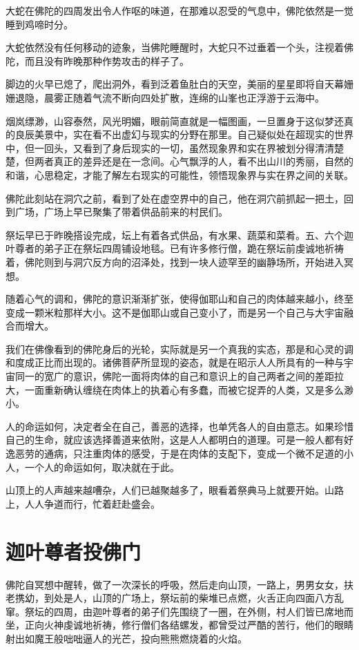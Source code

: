 \documentclass[12pt,twoside,openany]{book}
\begin{document}
大蛇在佛陀的四周发出令人作呕的味道，在那难以忍受的气息中，佛陀依然是一觉睡到鸡啼时分。

大蛇依然没有任何移动的迹象，当佛陀睡醒时，大蛇只不过垂着一个头，注视着佛陀，而且没有昨晚那种作势攻击的样子了。

脚边的火早已熄了，爬出洞外，看到泛着鱼肚白的天空，美丽的星星即将自天幕姗姗退隐，晨雾正随着气流不断向四处扩散，连绵的山峯也正浮游于云海中。

烟岚缥渺，山容泰然，风光明媚，眼前简直就是一幅图画，一旦置身于这似梦还真的良辰美景中，实在看不出虚幻与现实的分野在那里。自己疑似处在超现实的世界中，但一回头，又看到了身后现实的一切，虽然现象界和实在界被划分得清清楚楚，但两者真正的差异还是在一念间。心气飘浮的人，看不出山川的秀丽，自然的和谐，心思稳定，才能了解左右现实的可能性，领悟现象界与实在界之间的关联。

佛陀此刻站在洞穴之前，看到了处在虚空界中的自己，他在洞穴前抓起一把土，回到广场，广场上早已聚集了带着供品前来的村民们。

祭坛早已于昨晚搭设完成，坛上有着各式供品，有水果、蔬菜和菜肴。五、六个迦叶尊者的弟子正在祭坛四周铺设地毯。已有许多修行僧，跪在祭坛前虔诚地祈祷着，佛陀则到与洞穴反方向的沼泽处，找到一块人迹罕至的幽静场所，开始进入冥想。

随着心气的调和，佛陀的意识渐渐扩张，使得伽耶山和自己的肉体越来越小，终至变成一颗米粒那样大小。这不是伽耶山或自己变小了，而是另一个自己与大宇宙融合而增大。

我们在佛像看到的佛陀身后的光轮，实际就是另一个真我的实态，那是和心灵的调和度成正比而出现的。诸佛菩萨所显现的姿态，就是在昭示人人所具有的一种与宇宙同一的宽广的意识，佛陀一面将肉体的自己和意识上的自己两者之间的差距拉大，一面重新确认缠绕在肉体上的执着心有多蠢，而被它捉弄的人类，又是多么渺小。

人的命运如何，决定者全在自己，善恶的选择，也单凭各人的自由意志。如果珍惜自己的生命，就应该选择善道来依附，这是人人都明白的道理。可是一般人都有好逸恶劳的通病，只注重肉体的感受，于是在肉体的支配下，变成一个微不足道的小人，一个人的命运如何，取决就在于此。

山顶上的人声越来越嘈杂，人们已越聚越多了，眼看着祭典马上就要开始。山路上，人人争道而行，忙着赶赴盛会。

\section{迦叶尊者投佛门}\label{sec3.5}

佛陀自冥想中醒转，做了一次深长的呼吸，然后走向山顶，一路上，男男女女，扶老携幼，到处是人，山顶的广场上，祭坛前的柴堆已点燃，火舌正向四面八方乱窜。祭坛的四周，由迦叶尊者的弟子们先围绕了一圈，在外侧，村人们皆已席地而坐，正向火神虔诚地祈祷，修行僧们各结螺发，都曾受过严酷的苦行，他们的眼睛射出如魔王般咄咄逼人的光芒，投向熊熊燃烧着的火焰。
\end{document}
